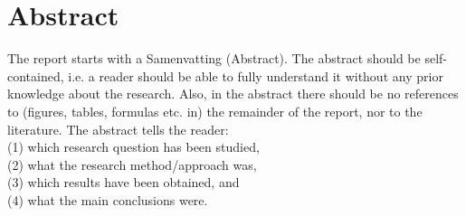 \section*{Abstract}
The report starts with a Samenvatting (Abstract).  The abstract should be self-contained, i.e. a reader should be able to fully understand it without any prior knowledge about the research. Also, in the abstract there should be no references to (figures, tables, formulas etc. in) the remainder of the report, nor to the literature.  The  abstract  tells  the  reader:\\ (1) which  research  question  has  been  studied,\\  (2) what  the  research method/approach was,\\ (3) which results have been obtained, and \\(4) what the main conclusions were.
